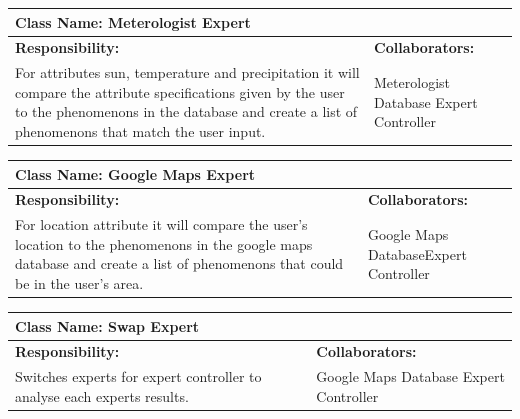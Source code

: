 \documentclass[]{article}
\begin{document}
\pagebreak 
	\begin{table}[!hb]
		\centering
		\begin{tabular}{|p{5cm}|p{5cm}|}
		\hline 
		 \multicolumn{2}{|l|}{\textbf{Class Name: Meterologist Expert}} \\
		\hline
		\textbf{Responsibility:} & \textbf{Collaborators:} \\
		\hline
		For attributes sun, temperature and precipitation it will compare the attribute specifications given by the user to the phenomenons in the database and create a list of phenomenons that match the user input.& Meterologist Database \newline Expert Controller\\
		\hline
		\end{tabular}
	\end{table}



	\begin{table}[!hb]
		\centering
		\begin{tabular}{|p{5cm}|p{5cm}|}
		\hline 
		 \multicolumn{2}{|l|}{\textbf{Class Name: Google Maps Expert}} \\
		\hline
		\textbf{Responsibility:} & \textbf{Collaborators:} \\
		\hline
		For location attribute it will compare the user's location to the phenomenons in the google maps database and create a list of phenomenons that could be in the user's area.& Google Maps Database\newline Expert Controller\\
		\hline
		\end{tabular}
	\end{table}

	\begin{table}[!hb]
		\centering
		\begin{tabular}{|p{5cm}|p{5cm}|}
		\hline 
		 \multicolumn{2}{|l|}{\textbf{Class Name: Swap Expert}} \\
		\hline
		\textbf{Responsibility:} & \textbf{Collaborators:} \\
		\hline
		Switches experts for expert controller to analyse each experts results. & Google Maps Database \newline  Expert Controller\\
		\hline
		\end{tabular}
	\end{table}
\end{document}
